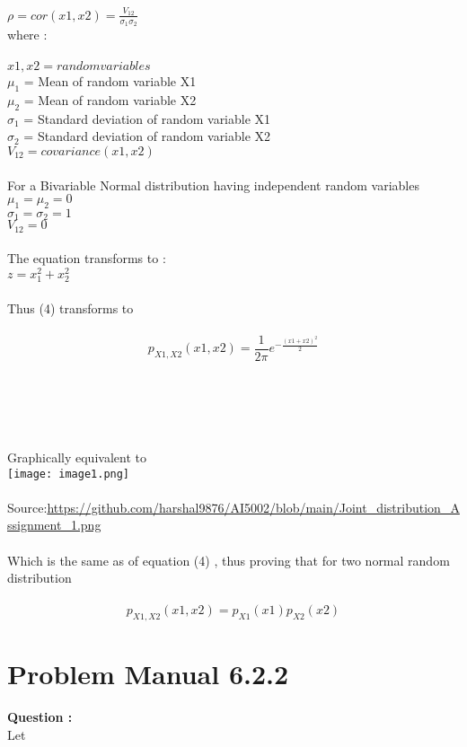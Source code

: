 \documentclass{article}
\begin{document}
 $\rho = cor(x1,x2) = \frac{V_{12}}{\sigma_{1}\sigma_{2}}$\\
 where :\\
 \\
 $x1,x2 = random variables$\\
 $\mu_{1}$ = Mean of random variable X1\\
 $\mu_{2}$ = Mean of random variable X2\\
 $\sigma_{1}$ = Standard deviation of random variable X1\\
 $\sigma_{2}$ = Standard deviation of random variable X2\\
 $V_{12}=covariance(x1,x2)$\\
 \\
 For a Bivariable Normal distribution having independent random variables\\
 $\mu_{1} = \mu_{2} = 0$\\
 $\sigma_{1} = \sigma_{2} = 1$\\
 $V_{12} = 0$\\
 \\
 The equation transforms to :\\
 $z = x_{1}^2 + x_{2}^2$ \\
 \\
Thus (4) transforms to \\
\\
 $$p_{X1,X2}(x1,x2) ={\frac {1}{ {{2\pi }}}}e^{-{\frac {(x1 + x2)^2}{2}}}$$\\
\\
\\
\\
\\
Graphically equivalent to\\
\texttt{[image: image1.png]}
\\
\\
Source:\url{https://github.com/harshal9876/AI5002/blob/main/Joint_distribution_Assignment_1.png}\\
\\
Which is the same as of equation (4) , thus proving that for two normal random distribution 
\\
\\
$$p_{X1,X2}(x1,x2) = p_{X1}(x1)p_{X2}(x2)$$



\newpage
\section{Problem Manual 6.2.2}
\textbf{Question :} \\
Let
\end{document}
